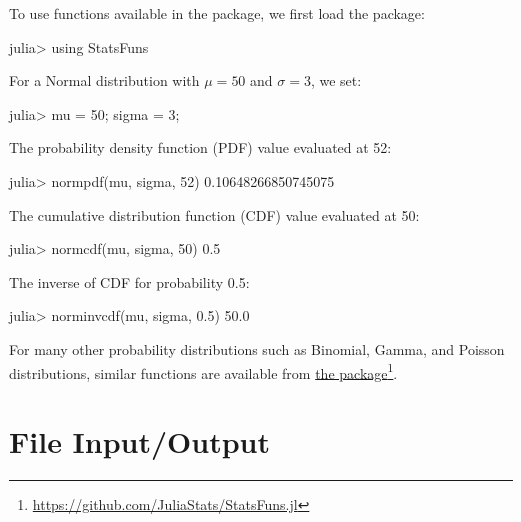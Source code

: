 To use functions available in the  package, we first load the package:
\begin{code}
julia> using StatsFuns
\end{code}
\noindent For a Normal distribution with $\mu=50$ and $\sigma=3$, we set:
\begin{code}
julia> mu = 50; sigma = 3;
\end{code}
\noindent The probability density function (PDF) value evaluated at 52:
\begin{code}
julia> normpdf(mu, sigma, 52)
0.10648266850745075
\end{code}
\noindent The cumulative distribution function (CDF) value evaluated at 50:
\begin{code}
julia> normcdf(mu, sigma, 50)
0.5
\end{code}
\noindent The inverse of CDF for probability 0.5:
\begin{code}
julia> norminvcdf(mu, sigma, 0.5)
50.0
\end{code}

For many other probability distributions such as Binomial, Gamma, and Poisson distributions, similar functions are available from \href{https://github.com/JuliaStats/StatsFuns.jl}{the  package}\footnote{\url{https://github.com/JuliaStats/StatsFuns.jl}}.











\section{File Input/Output} \label{sec:file_io}

